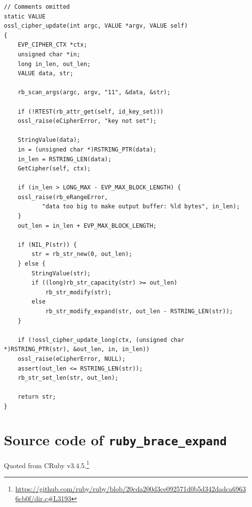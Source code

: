 \begin{lstlisting}[label={lst:ossl_cipher_update_full}]
// Comments omitted
static VALUE
ossl_cipher_update(int argc, VALUE *argv, VALUE self)
{
    EVP_CIPHER_CTX *ctx;
    unsigned char *in;
    long in_len, out_len;
    VALUE data, str;

    rb_scan_args(argc, argv, "11", &data, &str);

    if (!RTEST(rb_attr_get(self, id_key_set)))
	ossl_raise(eCipherError, "key not set");

    StringValue(data);
    in = (unsigned char *)RSTRING_PTR(data);
    in_len = RSTRING_LEN(data);
    GetCipher(self, ctx);

    if (in_len > LONG_MAX - EVP_MAX_BLOCK_LENGTH) {
	ossl_raise(rb_eRangeError,
		   "data too big to make output buffer: %ld bytes", in_len);
    }
    out_len = in_len + EVP_MAX_BLOCK_LENGTH;

    if (NIL_P(str)) {
        str = rb_str_new(0, out_len);
    } else {
        StringValue(str);
        if ((long)rb_str_capacity(str) >= out_len)
            rb_str_modify(str);
        else
            rb_str_modify_expand(str, out_len - RSTRING_LEN(str));
    }

    if (!ossl_cipher_update_long(ctx, (unsigned char *)RSTRING_PTR(str), &out_len, in, in_len))
	ossl_raise(eCipherError, NULL);
    assert(out_len <= RSTRING_LEN(str));
    rb_str_set_len(str, out_len);

    return str;
}
\end{lstlisting}

\section{Source code of \texttt{ruby\_brace\_expand}}\label{app:ruby_brace_expand}
Quoted from CRuby v3.4.5.\footnote{\url{https://github.com/ruby/ruby/blob/20cda200d3ce092571d0b5d342dadca69636cb0f/dir.c#L3193}}

